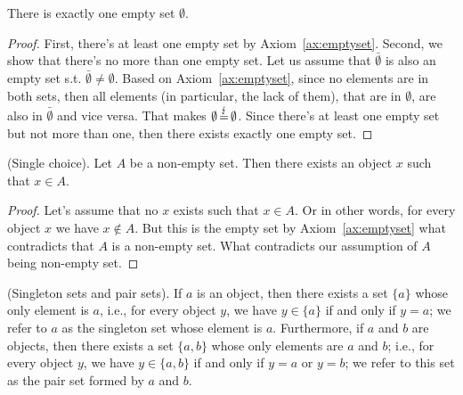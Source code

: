  \begin{proposition}
        \color{red}
    There is exactly one empty set $\emptyset$.
 \end{proposition}
 \begin{proof}
    First, there's at least one empty set by Axiom~\ref{ax:emptyset}.
    Second, we show that there's no more than one empty set.
    Let us assume that $\bar{\emptyset}$ is also an empty set s.t. $\bar{\emptyset} \neq \emptyset$. Based on Axiom~\ref{ax:emptyset}, since no elements are in both sets, then all elements (in particular, the lack of them), that are in $\emptyset$, are also in $\bar{\emptyset}$ and vice versa. That makes $\emptyset \operatorname{\stackrel{\lightning}{=}} \emptyset$. Since there's at least one empty set but not more than one, then there exists exactly one empty set.
 \end{proof}
\begin{lemma}
    \textup{(Single choice).} Let $A$ be a non-empty set. Then there exists an object $x$ such that $x \in A$.
\end{lemma}
\begin{proof}
    Let's assume that no $x$ exists such that $x\in A$. Or in other words, for every object $x$ we have $x\notin A$. But this is the empty set by Axiom~\ref{ax:emptyset} what contradicts that $A$ is a non-empty set. What contradicts our assumption of $A$ being non-empty set.
\end{proof}
\begin{axiom}
    \textup{(Singleton sets and pair sets).} If $a$ is an object, then there exists a set $\{a\}$ whose only element is $a$, i.e., for every object $y$, we have $y \in \{a\}$ if and only if $y=a$; we refer to ${a}$ as the singleton set whose element is $a$. Furthermore, if $a$ and $b$ are objects, then there exists a set $\{a, b\}$ whose only elements are $a$ and $b$; i.e., for every object $y$, we have $y\in \{a, b\}$ if and only if $y=a$ or $y=b$; we refer to this set as the pair set formed by $a$ and $b$.\label{ax:singleton_pair_sets}
\end{axiom}
